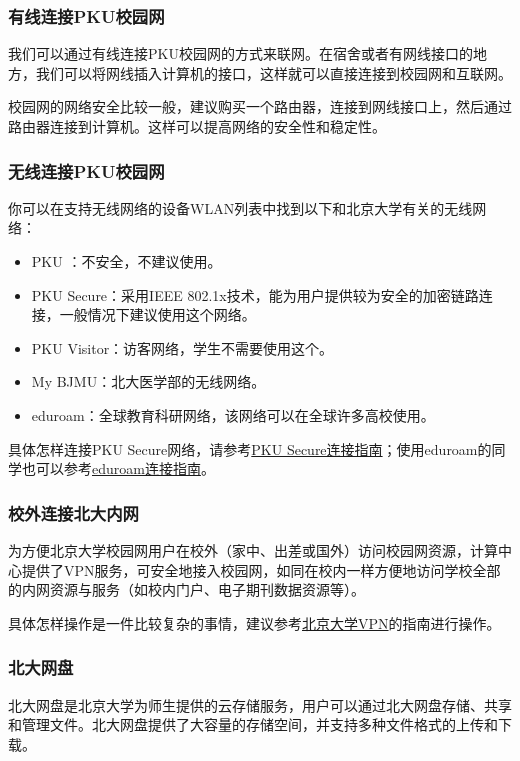 \documentclass[../main.tex]{subfiles}
\begin{document}
\subsubsection{有线连接PKU校园网}

我们可以通过有线连接PKU校园网的方式来联网。在宿舍或者有网线接口的地方，我们可以将网线插入计算机的接口，这样就可以直接连接到校园网和互联网。

校园网的网络安全比较一般，建议购买一个路由器，连接到网线接口上，然后通过路由器连接到计算机。这样可以提高网络的安全性和稳定性。

\subsubsection{无线连接PKU校园网}

你可以在支持无线网络的设备WLAN列表中找到以下和北京大学有关的无线网络：
\begin{itemize}
  \item PKU ：不安全，不建议使用。
  \item PKU Secure：采用IEEE 802.1x技术，能为用户提供较为安全的加密链路连接，一般情况下建议使用这个网络。
  \item PKU Visitor：访客网络，学生不需要使用这个。
  \item My BJMU：北大医学部的无线网络。
  \item eduroam：全球教育科研网络，该网络可以在全球许多高校使用。
\end{itemize}
具体怎样连接PKU Secure网络，请参考\href{https://its.pku.edu.cn/setting_6.jsp}{PKU Secure连接指南}；使用eduroam的同学也可以参考\href{https://its.pku.edu.cn/service_1_eduroam.jsp}{eduroam连接指南}。

\subsubsection{校外连接北大内网}

为方便北京大学校园网用户在校外（家中、出差或国外）访问校园网资源，计算中心提供了VPN服务，可安全地接入校园网，如同在校内一样方便地访问学校全部的内网资源与服务（如校内门户、电子期刊数据资源等）。

具体怎样操作是一件比较复杂的事情，建议参考\href{https://its.pku.edu.cn/service_1_vpn.jsp}{北京大学VPN}的指南进行操作。

\subsubsection{北大网盘}

北大网盘是北京大学为师生提供的云存储服务，用户可以通过北大网盘存储、共享和管理文件。北大网盘提供了大容量的存储空间，并支持多种文件格式的上传和下载。
\end{document}
